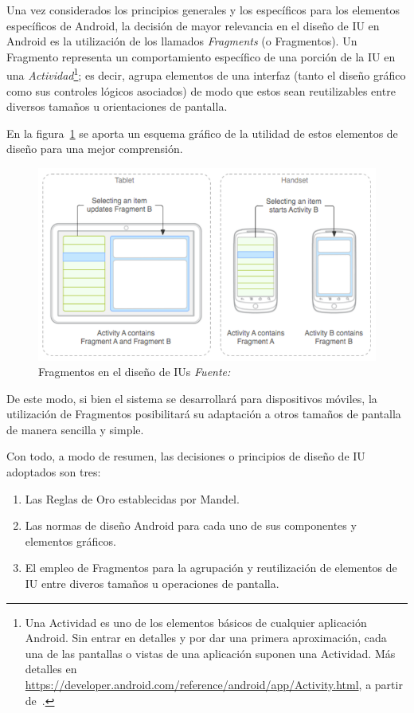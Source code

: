 Una vez considerados los principios generales y los específicos para los elementos específicos de Android, la decisión de mayor relevancia en el diseño de IU en Android es la utilización de los llamados \emph{Fragments} (o Fragmentos). Un Fragmento representa un comportamiento específico de una porción de la IU en una \emph{Actividad}\footnote{Una Actividad es uno de los elementos básicos de cualquier aplicación Android. Sin entrar en detalles y por dar una primera aproximación, cada una de las pantallas o vistas de una aplicación suponen una Actividad. Más detalles en \url{https://developer.android.com/reference/android/app/Activity.html}, a partir de~\cite{AnDev}.}; es decir, agrupa elementos de una interfaz (tanto el diseño gráfico como sus controles lógicos asociados) de modo que estos sean reutilizables entre diversos tamaños u orientaciones de pantalla.

En la figura~\ref{fig:fragmentsAndroid} se aporta un esquema gráfico de la utilidad de estos elementos de diseño para una mejor comprensión.

\begin{figure} [!htb]
	\centering
	\includegraphics[width=\linewidth,height=\textheight,keepaspectratio]{Images/FragmentsAndroid}
	\caption{Fragmentos en el diseño de IUs \textit{Fuente:~\cite{AnDev}}}
	\label{fig:fragmentsAndroid}
\end{figure}

De este modo, si bien el sistema se desarrollará para dispositivos móviles, la utilización de Fragmentos posibilitará su adaptación a otros tamaños de pantalla de manera sencilla y simple.

Con todo, a modo de resumen, las decisiones o principios de diseño de IU adoptados son tres:

\begin{enumerate}
	\item{Las Reglas de Oro establecidas por Mandel}.
	\item{Las normas de diseño Android para cada uno de sus componentes y elementos gráficos}.
	\item{El empleo de Fragmentos para la agrupación y reutilización de elementos de IU entre diveros tamaños u operaciones de pantalla}.
\end{enumerate}

